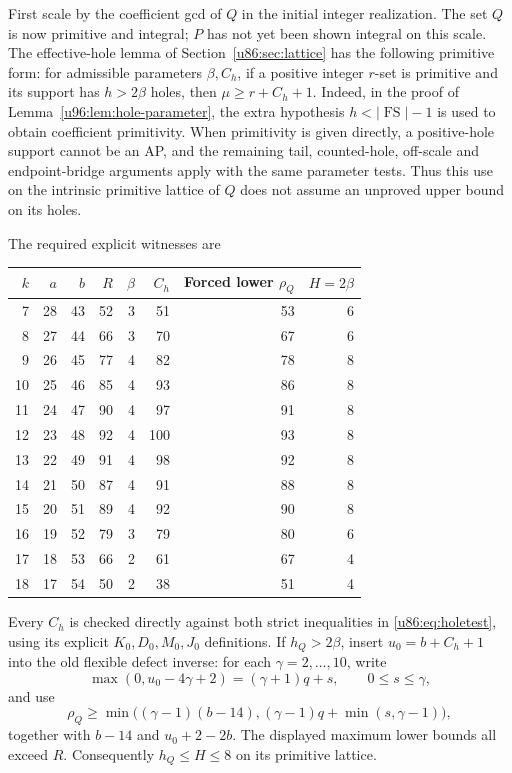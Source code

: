 \documentclass[11pt,a4paper]{article}
\theoremstyle{remark}
\newcommand{\FS}{\operatorname{FS}}
\begin{document}
First scale by the coefficient gcd of $Q$ in the initial integer
realization. The set $Q$ is now primitive and integral; $P$ has not yet
been shown integral on this scale.
The effective-hole lemma of Section~\ref{u86:sec:lattice} has the following
primitive form: for admissible parameters $\beta,C_h$, if a positive
integer $r$-set is primitive and its support has $h>2\beta$ holes, then
$\mu\ge r+C_h+1$.
Indeed, in the proof of Lemma~\ref{u96:lem:hole-parameter}, the extra hypothesis
$h<|\FS|-1$ is used to obtain coefficient primitivity. When primitivity
is given directly, a positive-hole support cannot be an AP, and the
remaining tail, counted-hole, off-scale and endpoint-bridge arguments
apply with the same parameter tests. Thus this use on the intrinsic
primitive lattice of $Q$ does not assume an unproved upper bound on
its holes.

The required explicit witnesses are
\begin{center}\small
\begin{tabular}{rrrrrrrr}
\toprule
$k$&$a$&$b$&$R$&$\beta$&$C_h$&Forced lower $\rho_Q$&$H=2\beta$\\\midrule
7&28&43&52&3&51&53&6\\
8&27&44&66&3&70&67&6\\
9&26&45&77&4&82&78&8\\
10&25&46&85&4&93&86&8\\
11&24&47&90&4&97&91&8\\
12&23&48&92&4&100&93&8\\
13&22&49&91&4&98&92&8\\
14&21&50&87&4&91&88&8\\
15&20&51&89&4&92&90&8\\
16&19&52&79&3&79&80&6\\
17&18&53&66&2&61&67&4\\
18&17&54&50&2&38&51&4\\\bottomrule
\end{tabular}
\end{center}
Every $C_h$ is checked directly against both strict inequalities in
\eqref{u86:eq:holetest}, using its explicit $K_0,D_0,M_0,J_0$ definitions.
If $h_Q>2\beta$, insert $u_0=b+C_h+1$ into the old flexible defect
inverse: for each $\gamma=2,\ldots,10$, write
\[
 \max(0,u_0-4\gamma+2)=(\gamma+1)q+s,
 \qquad0\le s\le\gamma,
\]
and use
\[
 \rho_Q\ge\min\bigl((\gamma-1)(b-14),
                    (\gamma-1)q+\min(s,\gamma-1)\bigr),
\]
together with $b-14$ and $u_0+2-2b$.
The displayed maximum lower bounds all exceed $R$.
Consequently $h_Q\le H\le8$ on its primitive lattice.
\end{document}
